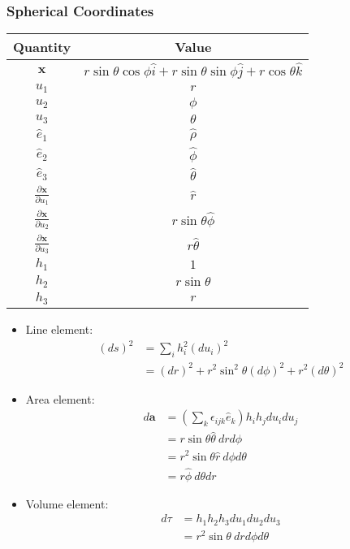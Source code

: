 \documentclass[10pt]{mypackage}
\begin{document}
\subsubsection{Spherical Coordinates}%
\begin{center}
  \begin{tabular}{c|c}
    Quantity & Value\\
    \hline\hline
    $\mathbf{x}$ & $r\sin\theta\cos\phi \hat{i} + r\sin\theta\sin\phi \hat{j} + r\cos\theta \hat{k}$\\
    \hline
    $u_1$ & $r$\\
    $u_2$ & $\phi$\\
    $u_3$ & $\theta$\\
    \hline
    $\hat{e}_1$ & $\hat{\rho}$\\
    $\hat{e}_2$ & $\hat{\phi}$\\
    $\hat{e}_3$ & $\hat{\theta}$\\
    \hline
    $\frac{\partial \mathbf{x}}{\partial u_1}$ & $\hat{r}$\\
    $\frac{\partial \mathbf{x}}{\partial u_2}$ & $r\sin\theta\hat{\phi}$\\
    $\frac{\partial \mathbf{x}}{\partial u_3}$ & $r\hat{\theta}$\\
    \hline
    $h_1$ & $1$\\
    $h_2$ & $r\sin\theta$\\
    $h_3$ & $r$
  \end{tabular}
\end{center}
\begin{itemize}
  \item Line element:
    \begin{align*}
      \left(ds\right)^2 &= \sum_{i}h_i^2\left(du_i\right)^2\\
                        &= \left(dr\right)^2 + r^2\sin^2\theta \left(d\phi\right)^2 + r^2\left(d\theta\right)^2
    \end{align*}
  \item Area element:
    \begin{align*}
      d\mathbf{a} &= \left(\sum_{k}\epsilon_{ijk}\hat{e}_k\right)h_ih_jdu_idu_j\\
                  &= r\sin\theta \hat{\theta}\: drd\phi\\
                  &= r^2\sin\theta\hat{r}\:d\phi d\theta\\
                  &= r\hat{\phi}\: d\theta dr
    \end{align*}
  \item Volume element:
    \begin{align*}
      d\tau &= h_1h_2h_3 du_1du_2du_3\\
            &= r^2\sin\theta\: dr d\phi d\theta
    \end{align*}
\end{itemize}
\end{document}
